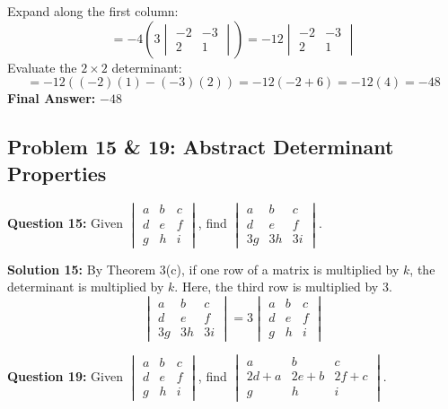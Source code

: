 \documentclass{article}
\begin{document}
Expand along the first column:
\[ = -4 \left( 3 \begin{vmatrix} -2 & -3 \\ 2 & 1 \end{vmatrix} \right) = -12 \begin{vmatrix} -2 & -3 \\ 2 & 1 \end{vmatrix} \]
Evaluate the $2 \times 2$ determinant:
\[ = -12 ((-2)(1) - (-3)(2)) = -12 (-2 + 6) = -12(4) = -48 \]
\textbf{Final Answer:} $-48$

\subsection{Problem 15 \& 19: Abstract Determinant Properties}
\textbf{Question 15:} Given $\begin{vmatrix} a & b & c \\ d & e & f \\ g & h & i \end{vmatrix}$, find $\begin{vmatrix} a & b & c \\ d & e & f \\ 3g & 3h & 3i \end{vmatrix}$.

\textbf{Solution 15:}
By Theorem 3(c), if one row of a matrix is multiplied by $k$, the determinant is multiplied by $k$. Here, the third row is multiplied by $3$.
\[ \begin{vmatrix} a & b & c \\ d & e & f \\ 3g & 3h & 3i \end{vmatrix} = 3 \begin{vmatrix} a & b & c \\ d & e & f \\ g & h & i \end{vmatrix} \]

\textbf{Question 19:} Given $\begin{vmatrix} a & b & c \\ d & e & f \\ g & h & i \end{vmatrix}$, find $\begin{vmatrix} a & b & c \\ 2d+a & 2e+b & 2f+c \\ g & h & i \end{vmatrix}$.
\end{document}

